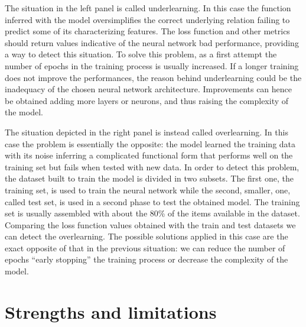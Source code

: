 \documentclass[a4paper,10pt]{report}
\begin{document}
The situation in the left panel is called underlearning. In this case the 
function inferred with the model oversimplifies the correct underlying relation failing 
to predict some of its characterizing features. The loss function and other metrics
should return values indicative of the neural network bad performance, providing
a way to detect this situation.
To solve this problem, as a first attempt the number of epochs in the training process is
usually increased. If a longer training does not improve the performances, the reason behind
underlearning could be the inadequacy of the chosen neural network architecture. 
Improvements can hence be obtained adding more layers or neurons, and thus raising the complexity of the model.

The situation depicted in the right panel is instead called overlearning.
In this case the problem is essentially the opposite: the model learned the training data
with its noise inferring a complicated functional form that performs
well on the training set but fails when tested with new data. In order to detect this problem,
the dataset built to train the model is divided in two subsets. The first one, the training set, is used to
train the neural network while the second, smaller, one, called test set, is used in a second phase to
test the obtained model. The training set is usually assembled with about the 80\% of the items available in the dataset.
Comparing the loss function values obtained with the train and test datasets we can
detect the overlearning. 
The possible solutions applied in this case are the exact opposite of that in the previous situation:
we can reduce the number of epochs ``early stopping'' the training process or decrease the complexity of
the model.

\section{Strengths and limitations}

\end{document}
